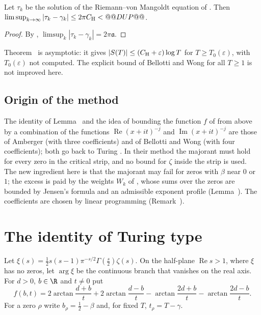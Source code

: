 \begin{corollary}\label{cor:distance}
Let $\tau_k$ be the solution of the Riemann--von Mangoldt equation of \cite[(1.4)]{CasanaGiner2026}. Then $\limsup_{k\to\infty}|\tau_k-\gamma_k|\le2\pi C_{\rm H}<@@DUP@@$.
\end{corollary}

\begin{proof}
By \cite[Prop.~6.2]{CasanaGiner2026}, $\limsup_k|\tau_k-\gamma_k|=2\pi\mathfrak a$.
\end{proof}

Theorem~ is asymptotic: it gives $|S(T)|\le(C_{\rm H}+\varepsilon)\log T$ for $T\ge T_0(\varepsilon)$, with $T_0(\varepsilon)$ not computed. The explicit bound of Bellotti and Wong for all $T\ge1$ is not improved here.

\subsection{Origin of the method}\label{subsec:origin}
The identity of Lemma~ and the idea of bounding the function $f$ of  from above by a combination of the functions $\operatorname{Re}(x+it)^{-j}$ and $\operatorname{Im}(x+it)^{-j}$ are those of Amberger \cite[\S2]{Amberger2025} (with three coefficients) and of Bellotti and Wong \cite[\S2]{BellottiWong2026} (with four coefficients); both go back to Turing \cite{Turing1953}. In their method the majorant must hold for every zero in the critical strip, and no bound for $\zeta$ inside the strip is used. The new ingredient here is that the majorant may fail for zeros with $\beta$ near $0$ or $1$; the excess is paid by the weights $W_k$ of , whose sums over the zeros are bounded by Jensen's formula and an admissible exponent profile (Lemma~). The coefficients are chosen by linear programming (Remark~).

\section{The identity of Turing type}\label{sec:identity}

Let $\xi(s)=\frac12s(s-1)\pi^{-s/2}\Gamma(\frac s2)\zeta(s)$. On the half-plane $\operatorname{Re}s>1$, where $\xi$ has no zeros, let $\arg\xi$ be the continuous branch that vanishes on the real axis. For $d>0$, $b\in\R$ and $t\ne0$ put
\begin{equation}
f(b,t)=2\arctan\frac{d+b}t+2\arctan\frac{d-b}t-\arctan\frac{2d+b}t-\arctan\frac{2d-b}t .
\label{eq:f_def}
\end{equation}
For a zero $\rho$ write $b_\rho=\frac12-\beta$ and, for fixed $T$, $t_\rho=T-\gamma$.

